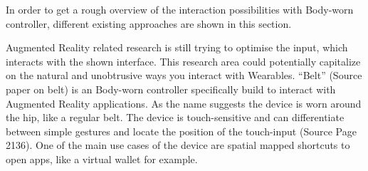 \documentclass{sigchi}
\begin{document}
In order to get a rough overview of the interaction possibilities with Body-worn controller, different existing approaches are shown in this section.

Augmented Reality related research is still trying to optimise the input, which interacts with the shown interface. This research area could potentially capitalize on the natural and unobtrusive ways you interact with Wearables.
“Belt” (Source paper on belt) is an Body-worn controller specifically build to interact with Augmented Reality applications. As the name suggests the device is worn around the hip, like a regular belt. The device is touch-sensitive and can differentiate between simple gestures and locate the position of the touch-input (Source Page 2136). One of the main use cases of the device are spatial mapped shortcuts to open apps, like a virtual wallet for example.
\end{document}
